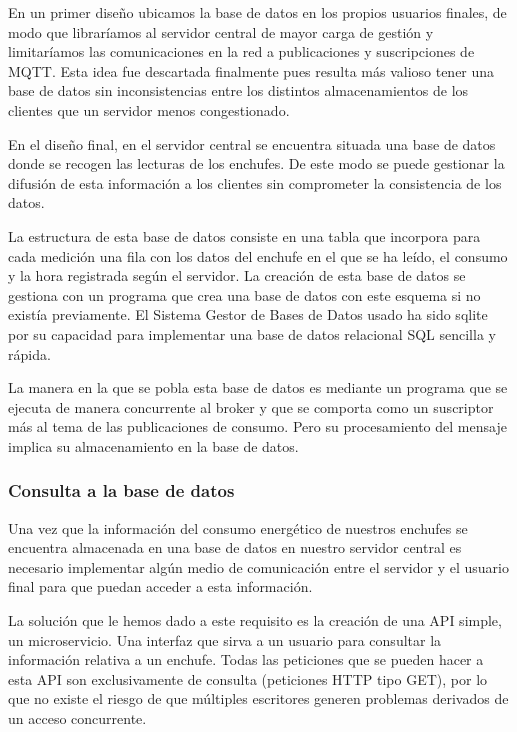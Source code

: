 \documentclass[a4paper,10pt]{article}
\begin{document}
En un primer diseño ubicamos la base de datos en los propios usuarios
finales, de modo que libraríamos al servidor central de mayor carga de
gestión y limitaríamos las comunicaciones en la red a publicaciones y
suscripciones de MQTT. Esta idea fue descartada finalmente pues
resulta más valioso tener una base de datos sin inconsistencias entre
los distintos almacenamientos de los clientes que un servidor menos
congestionado.

En el diseño final, en el servidor central se encuentra situada una
base de datos donde se recogen las lecturas de los enchufes. De este
modo se puede gestionar la difusión de esta información a los clientes
sin comprometer la consistencia de los datos.

La estructura de esta base de datos consiste en una tabla que
incorpora para cada medición una fila con los datos del enchufe en el
que se ha leído, el consumo y la hora registrada según el servidor. La
creación de esta base de datos se gestiona con un programa que crea
una base de datos con este esquema si no existía previamente. El
Sistema Gestor de Bases de Datos usado ha sido
sqlite\cite{SQLiteHomePage} por su capacidad para implementar una base
de datos relacional SQL sencilla y rápida.

La manera en la que se pobla esta base de datos es mediante un
programa que se ejecuta de manera concurrente al broker y que se
comporta como un suscriptor más al tema de las publicaciones de
consumo. Pero su procesamiento del mensaje implica su almacenamiento
en la base de datos.

\subsubsection{Consulta a la base de datos}\label{subsubsec:consulta-api}

Una vez que la información del consumo energético de nuestros enchufes
se encuentra almacenada en una base de datos en nuestro servidor
central es necesario implementar algún medio de comunicación entre el
servidor y el usuario final para que puedan acceder a esta
información.

La solución que le hemos dado a este requisito es la creación de una
API simple, un microservicio. Una interfaz que sirva a un usuario para
consultar la información relativa a un enchufe. Todas las peticiones
que se pueden hacer a esta API son exclusivamente de consulta
(peticiones HTTP tipo GET), por lo que no existe el riesgo de que
múltiples escritores generen problemas derivados de un acceso
concurrente.
\end{document}
